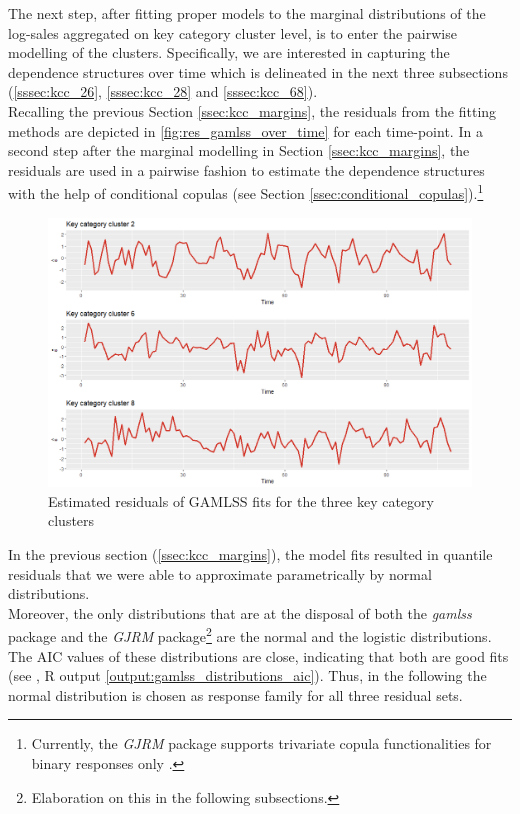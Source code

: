 
The next step, after fitting proper models to the marginal distributions of the log-sales aggregated on key category cluster level, is to enter the pairwise modelling of the clusters. Specifically, we are interested in capturing the dependence structures over time which is delineated in the next three subsections (\ref{sssec:kcc_26}, \ref{sssec:kcc_28} and \ref{sssec:kcc_68}).
\\

Recalling the previous Section \ref{ssec:kcc_margins}, the residuals from the fitting methods are depicted in \autoref{fig:res_gamlss_over_time} for each time-point. In a second step after the marginal modelling in Section \ref{ssec:kcc_margins}, the residuals are used in a pairwise fashion to estimate the dependence structures with the help of conditional copulas (see Section \ref{ssec:conditional_copulas}).\footnote{Currently, the \textit{GJRM} package supports trivariate copula functionalities for binary responses only \citep{marragjrm}.}
\\

\begin{figure}[H]
\centering
  \includegraphics[width=0.95\linewidth]{figures/res_gamlss_over_time.png}
  \caption{Estimated residuals of GAMLSS fits for the three key category clusters}
  \label{fig:res_gamlss_over_time}
\end{figure}










In the previous section (\ref{ssec:kcc_margins}), the model fits resulted in quantile residuals that we were able to approximate parametrically by normal distributions. \\
Moreover, the only distributions that are at the disposal of both the \textit{gamlss} package \citep{rigby2005generalized} and the \textit{GJRM} package\footnote{Elaboration on this in the following subsections.} \citep{marragjrm} are the normal and the logistic distributions. The \ac{AIC} values of these distributions are close, indicating that both are good fits (see , R output \ref{output:gamlss_distributions_aic}). Thus, in the following the normal distribution is chosen as response family for all three residual sets.


